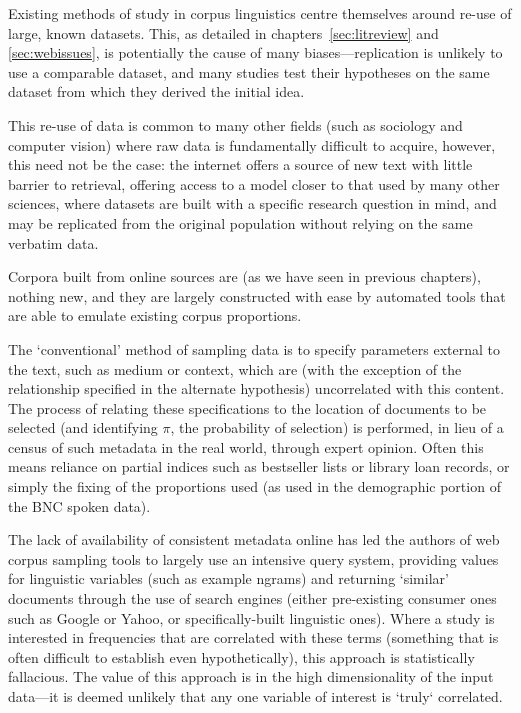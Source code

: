 

Existing methods of study in corpus linguistics centre themselves around re-use of large, known datasets.  This, as detailed in chapters~\ref{sec:litreview} and \ref{sec:webissues}, is potentially the cause of many biases---replication is unlikely to use a comparable dataset, and many studies test their hypotheses on the same dataset from which they derived the initial idea.

This re-use of data is common to many other fields (such as sociology and computer vision) where raw data is fundamentally difficult to acquire, however, this need not be the case: the internet offers a source of new text with little barrier to retrieval, offering access to a model closer to that used by many other sciences, where datasets are built with a specific research question in mind, and may be replicated from the original population without relying on the same verbatim data.

Corpora built from online sources are (as we have seen in previous chapters), nothing new, and they are largely constructed with ease by automated tools that are able to emulate existing corpus proportions.

The `conventional' method of sampling data is to specify parameters external to the text, such as medium or context, which are (with the exception of the relationship specified in the alternate hypothesis) uncorrelated with this content.  The process of relating these specifications to the location of documents to be selected (and identifying $\pi$, the probability of selection) is performed, in lieu of a census of such metadata in the real world, through expert opinion.  Often this means reliance on partial indices such as bestseller lists or library loan records, or simply the fixing of the proportions used (as used in the demographic portion of the BNC spoken data).


The lack of availability of consistent metadata online has led the authors of web corpus sampling tools to largely use an intensive query system, providing values for linguistic variables (such as example ngrams) and returning `similar' documents through the use of search engines (either pre-existing consumer ones such as Google or Yahoo, or specifically-built linguistic ones).  Where a study is interested in frequencies that are correlated with these terms (something that is often difficult to establish even hypothetically), this approach is statistically fallacious.  The value of this approach is in the high dimensionality of the input data---it is deemed unlikely that any one variable of interest is `truly` correlated.


